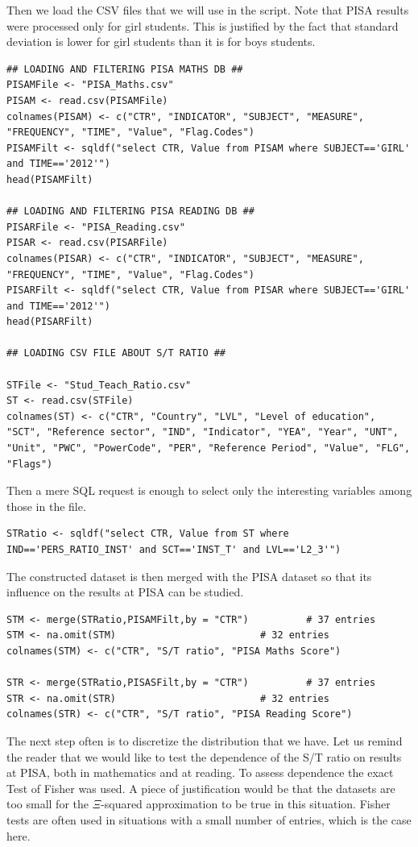 \documentclass[12pt,a4paper]{article}
\begin{document}
Then we load the CSV files that we will use in the script. Note that PISA results were processed only for girl students. This is justified by the fact that standard deviation is lower for girl students than it is for boys students.
\begin{lstlisting}
## LOADING AND FILTERING PISA MATHS DB ##
PISAMFile <- "PISA_Maths.csv"
PISAM <- read.csv(PISAMFile)
colnames(PISAM) <- c("CTR", "INDICATOR", "SUBJECT", "MEASURE", "FREQUENCY", "TIME", "Value", "Flag.Codes")
PISAMFilt <- sqldf("select CTR, Value from PISAM where SUBJECT=='GIRL' and TIME=='2012'")
head(PISAMFilt)

## LOADING AND FILTERING PISA READING DB ##
PISARFile <- "PISA_Reading.csv"
PISAR <- read.csv(PISARFile)
colnames(PISAR) <- c("CTR", "INDICATOR", "SUBJECT", "MEASURE", "FREQUENCY", "TIME", "Value", "Flag.Codes")
PISARFilt <- sqldf("select CTR, Value from PISAR where SUBJECT=='GIRL' and TIME=='2012'")
head(PISARFilt)

## LOADING CSV FILE ABOUT S/T RATIO ##

STFile <- "Stud_Teach_Ratio.csv"
ST <- read.csv(STFile)
colnames(ST) <- c("CTR", "Country", "LVL", "Level of education", "SCT", "Reference sector", "IND", "Indicator", "YEA", "Year", "UNT", "Unit", "PWC", "PowerCode", "PER", "Reference Period", "Value", "FLG", "Flags")
\end{lstlisting}
Then a mere SQL request is enough to select only the interesting variables among those in the file.
\begin{lstlisting}
STRatio <- sqldf("select CTR, Value from ST where IND=='PERS_RATIO_INST' and SCT=='INST_T' and LVL=='L2_3'")
\end{lstlisting}
The constructed dataset is then merged with the PISA dataset so that its influence on the results at PISA can be studied.
\begin{lstlisting}
STM <- merge(STRatio,PISAMFilt,by = "CTR")			# 37 entries
STM <- na.omit(STM)							# 32 entries
colnames(STM) <- c("CTR", "S/T ratio", "PISA Maths Score")

STR <- merge(STRatio,PISASFilt,by = "CTR")			# 37 entries
STR <- na.omit(STR)							# 32 entries
colnames(STR) <- c("CTR", "S/T ratio", "PISA Reading Score")
\end{lstlisting}
The next step often is to discretize the distribution that we have. Let us remind the reader that we would like to test the dependence of the S/T ratio on results at PISA, both in mathematics and at reading. To assess dependence the exact Test of Fisher was used. A piece of justification would be that the datasets are too small for the $\Xi$-squared approximation to be true in this situation. Fisher tests are often used in situations with a small number of entries, which is the case here.
\end{document}
